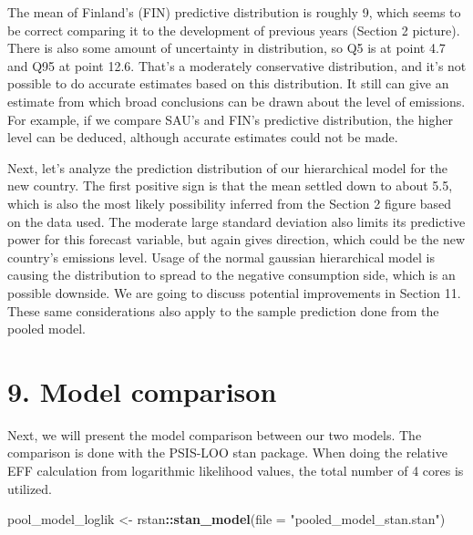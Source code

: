 \documentclass[
]{article}
\newenvironment{Shaded}{\begin{snugshade}}{\end{snugshade}}
\newcommand{\DataTypeTok}[1]{\textcolor[rgb]{0.13,0.29,0.53}{#1}}
\newcommand{\KeywordTok}[1]{\textcolor[rgb]{0.13,0.29,0.53}{\textbf{#1}}}
\newcommand{\NormalTok}[1]{#1}
\newcommand{\OperatorTok}[1]{\textcolor[rgb]{0.81,0.36,0.00}{\textbf{#1}}}
\newcommand{\StringTok}[1]{\textcolor[rgb]{0.31,0.60,0.02}{#1}}
\begin{document}
The mean of Finland's (FIN) predictive distribution is roughly 9, which
seems to be correct comparing it to the development of previous years
(Section 2 picture). There is also some amount of uncertainty in
distribution, so Q5 is at point 4.7 and Q95 at point 12.6. That's a
moderately conservative distribution, and it's not possible to do
accurate estimates based on this distribution. It still can give an
estimate from which broad conclusions can be drawn about the level of
emissions. For example, if we compare SAU's and FIN's predictive
distribution, the higher level can be deduced, although accurate
estimates could not be made.

Next, let's analyze the prediction distribution of our hierarchical
model for the new country. The first positive sign is that the mean
settled down to about 5.5, which is also the most likely possibility
inferred from the Section 2 figure based on the data used. The moderate
large standard deviation also limits its predictive power for this
forecast variable, but again gives direction, which could be the new
country's emissions level. Usage of the normal gaussian hierarchical
model is causing the distribution to spread to the negative consumption
side, which is an possible downside. We are going to discuss potential
improvements in Section 11. These same considerations also apply to the
sample prediction done from the pooled model.

\hypertarget{model-comparison}{%
\section{9. Model comparison}\label{model-comparison}}

Next, we will present the model comparison between our two models. The
comparison is done with the PSIS-LOO stan package. When doing the
relative EFF calculation from logarithmic likelihood values, the total
number of 4 cores is utilized.

\begin{Shaded}
\begin{Highlighting}[]
\NormalTok{pool\_model\_loglik \textless{}{-}}\StringTok{ }\NormalTok{rstan}\OperatorTok{::}\KeywordTok{stan\_model}\NormalTok{(}\DataTypeTok{file =} \StringTok{"pooled\_model\_stan.stan"}\NormalTok{)}
\end{Highlighting}
\end{Shaded}
\end{document}
